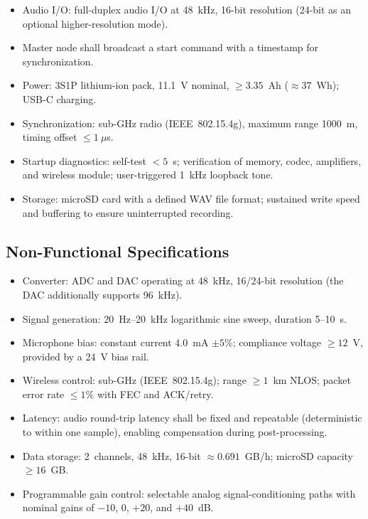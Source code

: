 \begin{itemize}
    \item Audio I/O: full-duplex audio I/O at 48~kHz, 16-bit resolution (24-bit as an optional higher-resolution mode).
    \item Master node shall broadcast a start command with a timestamp for synchronization.
    \item Power: 3S1P lithium-ion pack, 11.1~V nominal, $\geq 3.35$~Ah ($\approx 37$~Wh); USB-C charging.
    \item Synchronization: sub-GHz radio (IEEE~802.15.4g), maximum range 1000~m, timing offset $\leq 1~\mu$s.
    \item Startup diagnostics: self-test $<5$~s; verification of memory, codec, amplifiers, and wireless module; user-triggered 1~kHz loopback tone.
    \item Storage: microSD card with a defined WAV file format; sustained write speed and buffering to ensure uninterrupted recording.
\end{itemize}

\subsection{Non-Functional Specifications}

\begin{itemize}
    \item Converter: ADC and DAC operating at 48~kHz, 16/24-bit resolution (the DAC additionally supports 96~kHz).
    \item Signal generation: 20~Hz--20~kHz logarithmic sine sweep, duration 5--10~s.
    \item Microphone bias: constant current 4.0~mA $\pm 5\%$; compliance voltage $\geq 12$~V, provided by a 24~V bias rail.
    \item Wireless control: sub-GHz (IEEE~802.15.4g); range $\geq 1$~km NLOS; packet error rate $\leq 1\%$ with FEC and ACK/retry.
    \item Latency: audio round-trip latency shall be fixed and repeatable (deterministic to within one sample), enabling compensation during post-processing.
    \item Data storage: 2~channels, 48~kHz, 16-bit $\approx 0.691$~GB/h; microSD capacity $\geq 16$~GB.
    \item Programmable gain control: selectable analog signal-conditioning paths with nominal gains of $-10$, $0$, $+20$, and $+40$~dB.
\end{itemize}